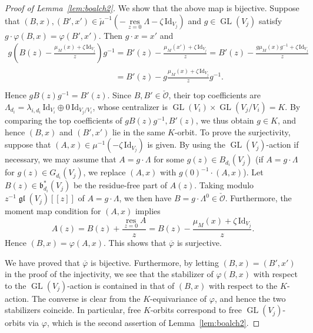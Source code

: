 \documentclass[pdftex]{sigma}
\numberwithin{equation}{section}
\theoremstyle{definition}
\newcommand{\lemref}[1]{Lemma~\ref{#1}}
\newcommand{\GL}{\operatorname{GL}} %
\newcommand{\gl}{\operatorname{\mathfrak{gl}}}
\newcommand{\frb}{\mathfrak{b}}
\newcommand{\unit}{\mathrm{Id}}
\newcommand{\ov}{\overline}
\newcommand{\res}{\operatorname*{res}}
\newcommand{\bO}{\mathcal{O}}
\begin{document}
\begin{proof}[Proof of \lemref{lem:boalch2}]
We show that the above map is bijective.
Suppose that
$(B,x), (B',x') \in \check{\mu}^{-1}(-\res\limits_{z=0}\Lambda -\zeta\,\unit_{V_j})$
and $g \in \GL(V_j)$ satisfy $g \cdot \varphi(B,x) =\varphi(B',x')$.
Then $g \cdot x=x'$ and
\begin{gather*}
g \left( B(z)-\frac{\mu_M(x)+\zeta\,\unit_{V_j}}{z} \right) \! g^{-1}  =
B'(z)-\frac{\mu_M(x')+\zeta\,\unit_{V_j}}{z}
 =B'(z)-\frac{g\mu_M(x)g^{-1}\!+\zeta\,\unit_{V_j}}{z}\! \\
\phantom{g \left( B(z)-\frac{\mu_M(x)+\zeta\,\unit_{V_j}}{z} \right) g^{-1}}{}
=B'(z)-g\frac{\mu_M(x)+\zeta\,\unit_{V_j}}{z}g^{-1}.
\end{gather*}
Hence $gB(z)g^{-1}=B'(z)$.
Since $B, B' \in \check{\bO}$, their top coef\/f\/icients
are $\Lambda_{d_i}=\lambda_{i,d_i}\,\unit_{V_i} \oplus 0\,\unit_{V_j/V_i}$,
whose centralizer is $\GL(V_i) \times \GL(V_j/V_i) =K$.
By comparing the top coef\/f\/icients of $gB(z)g^{-1}, B'(z)$,
we thus obtain $g \in K$,
and hence $(B,x)$ and $(B',x')$ lie in the same $K$-orbit.
To prove the surjectivity,
suppose that $(A,x) \in \mu^{-1}(-\zeta\,\unit_{V_j})$ is given.
By using the $\GL(V_j)$-action if necessary, we may assume that
$A=g \cdot \Lambda$ for some $g(z) \in B_{d_i}(V_j)$
(if $A=g \cdot \Lambda$ for $g(z) \in G_{d_i}(V_j)$,
we replace $(A,x)$ with $g(0)^{-1} \cdot (A,x)$).
Let $B(z) \in \frb_{d_i}^*(V_j)$ be the residue-free part of $A(z)$.
Taking modulo $z^{-1}\gl(V_j)[[z]]$ of $A=g\cdot \Lambda$,
we then have $B=g \cdot \Lambda^0 \in \check{\bO}$.
Furthermore, the moment map condition for $(A,x)$
implies
\[
A(z) = B(z) + \frac{\res\limits_{z=0}A}{z}
= B(z)-\frac{\mu_M(x)+\zeta\,\unit_{V_j}}{z}.
\]
Hence $(B,x) =\varphi(A,x)$.
This shows that $\ov{\varphi}$ is surjective.

We have proved that $\ov{\varphi}$ is bijective.
Furthermore, by letting $(B,x)=(B',x')$ in the proof of
the injectivity, we see that
the stabilizer of $\varphi(B,x)$ with respect to the $\GL(V_j)$-action
is contained in that of $(B,x)$ with respect to the $K$-action.
The converse is clear from the $K$-equivariance of $\varphi$,
and hence the two stabilizers coincide.
In particular, free $K$-orbits correspond to free $\GL(V_j)$-orbits
via $\varphi$, which is the second assertion of \lemref{lem:boalch2}.


\end{proof}
\end{document}
